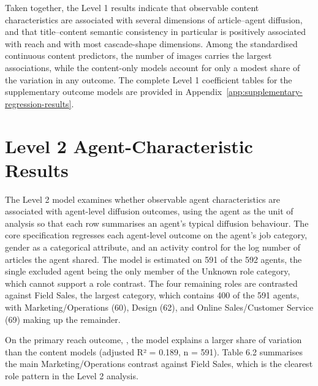 Taken together, the Level 1 results indicate that observable content characteristics are associated with several dimensions of article–agent diffusion, and that title–content semantic consistency in particular is positively associated with reach and with most cascade-shape dimensions. Among the standardised continuous content predictors, the number of images carries the largest associations, while the content-only models account for only a modest share of the variation in any outcome. The complete Level 1 coefficient tables for the supplementary outcome models are provided in Appendix~\ref{app:supplementary-regression-results}.

\section{Level 2 Agent-Characteristic Results}
\label{sec:6-3-level-2-agent-characteristic-results}

The Level 2 model examines whether observable agent characteristics are associated with agent-level diffusion outcomes, using the agent as the unit of analysis so that each row summarises an agent's typical diffusion behaviour. The core specification regresses each agent-level outcome on the agent's job category, gender as a categorical attribute, and an activity control for the log number of articles the agent shared. The model is estimated on 591 of the 592 agents, the single excluded agent being the only member of the Unknown role category, which cannot support a role contrast. The four remaining roles are contrasted against Field Sales, the largest category, which contains 400 of the 591 agents, with Marketing/Operations (60), Design (62), and Online Sales/Customer Service (69) making up the remainder.

On the primary reach outcome, , the model explains a larger share of variation than the content models (adjusted R² = 0.189, n = 591). Table 6.2 summarises the main Marketing/Operations contrast against Field Sales, which is the clearest role pattern in the Level 2 analysis.

